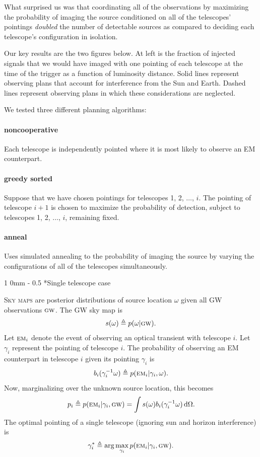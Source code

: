 \documentclass[portrait]{a0poster}
\makeatletter
\newcommand{\EM}[1]{\ensuremath{\textsc{\textrm{em}}_#1}}
\newcommand{\GW}{\ensuremath{\textsc{\textrm{gw}}}}
\renewcommand{\section}{\@startsection
{section}%
{1}%
{0mm}%
{-\baselineskip}%
{0.5\baselineskip}%
{\fontspec{Marvel Bold}\Huge}} %
\makeatother
\begin{document}
What surprised us was that coordinating all of the observations by maximizing the probability of imaging the source conditioned on all of the telescopes’ pointings \emph{doubled} the number of detectable sources as compared to deciding each telescope’s configuration in isolation.

\framebreak

Our key results are the two figures below.  At left is the fraction of injected signals that we would have imaged with one pointing of each telescope at the time of the trigger as a function of luminosity distance.  Solid lines represent observing plans that account for interference from the Sun and Earth.  Dashed lines represent observing plans in which these considerations are neglected.

We tested three different planning algorithms:

\paragraph{\color{red}noncooperative}
Each telescope is independently pointed where it is most likely to observe an EM counterpart.

\paragraph{\color{green!50!black}greedy sorted}
Suppose that we have chosen pointings for telescopes 1, 2, $\dots$, $i$.  The pointing of telescope $i+1$ is chosen to maximize the probability of detection, subject to telescopes 1, 2, $\dots$, $i$, remaining fixed.

\paragraph{\color{blue}anneal}
Uses simulated annealing to the probability of imaging the source by varying the configurations of all of the telescopes simultaneously.

\framebreak

\section*{Single telescope case}

\lettrine{S}{ky maps} are posterior distributions of source location $\omega$ given all GW observations \GW.  The GW sky map is
%
$$
	s(\omega) \triangleq p(\omega | \GW).
$$
%
Let $\EM{i}$ denote the event of observing an optical transient with telescope $i$.  Let $\gamma_i$ represent the pointing of telescope $i$.  The probability of observing an EM counterpart in telescope $i$ given its pointing $\gamma_i$ is
%
$$
	b_i(\gamma_i^{-1} \omega) \triangleq p(\EM{i} | \gamma_i, \omega).
$$
%
Now, marginalizing over the unknown source location, this becomes
%
\begin{equation}
	\label{eq:single-telescope-integral}
	p_i \triangleq p (\EM{i} | \gamma_i, \GW) = \int s(\omega) b_i(\gamma_i^{-1} \omega) \, \mathrm{d}\Omega.
\end{equation}
%
The optimal pointing of a single telescope (ignoring sun and horizon interference) is
%
$$
	\gamma_i^* \triangleq \arg \max_{\gamma_i} p(\EM{i} | \gamma_i, \GW).
$$
\end{document}
